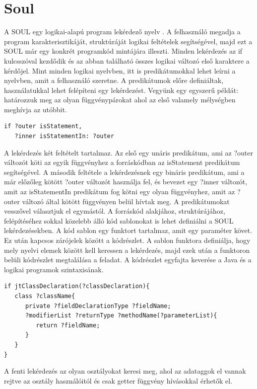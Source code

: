 \documentclass[a4paper,12pt]{report}
\begin{document}
\section{Soul}
\par A SOUL egy logikai-alapú program lekérdező nyelv \cite{soul}. A felhasználó megadja a program karakterisztikáját, struktúráját logikai feltételek segítségével, majd ezt a SOUL már egy konkrét programkód mintájára illeszti.
Minden lekérdezés az if kulcsszóval kezdődik és az abban található összes logikai változó első karaktere a kérdőjel. Mint minden logikai nyelvben, itt is predikátumokkal lehet leírni a nyelvben, amit a felhasználó szeretne. A predikátumok előre definiáltak, használatukkal lehet felépíteni egy lekérdezést. Vegyünk egy egyszerű példát: határozzuk meg az olyan függvénypárokat ahol az első valamely mélységben meghívja az utóbbit.
\begin{verbatim}
if ?outer isStatement, 
   ?inner isStatementIn: ?outer
\end{verbatim}
\par A lekérdezés két feltételt tartalmaz. Az első egy unáris predikátum, ami az ?outer változót köti az egyik függvényhez a forráskódban az isStatement predikátum segítségével. A második feltétele a lekérdezésnek egy bináris predikátum, ami a már előzőleg kötött ?outer változót használja fel, és bevezet egy ?inner változót, amit az isStatementIn predikátum fog kötni egy olyan függvényhez, amit az ?outer változó által kötött függvényen belül hívtak meg. A predikátumokat vesszővel választjuk el egymástól. A forráskód alakjához, struktúrájához, felépítéséhez sokkal közelebb álló kód sablonokat is lehet definiálni a SOUL lekérdezésekben. A kód sablon egy funktort tartalmaz, amit egy paraméter követ. Ez után kapcsos zárójelek között a kódrészlet. A sablon funktora definiálja, hogy mely nyelvi elemek között kell keressen a lekérdezés, majd ezek után a funktoron belüli kódrészlet megtalálása a feladat. A kódrészlet egyfajta keverése a Java és a logikai programok szintaxisának.
\begin{verbatim}
if jtClassDeclaration(?classDeclaration){
   class ?className{
      private ?fieldDeclarationType ?fieldName;
      ?modifierList ?returnType ?methodName(?parameterList){
         return ?fieldName;
      }
   }
}
\end{verbatim}
A fenti lekérdezés az olyan osztályokat keresi meg, ahol az adataggok el vannak rejtve az osztály használóitól és csak getter függvény hívásokkal érhetők el.
\end{document}
